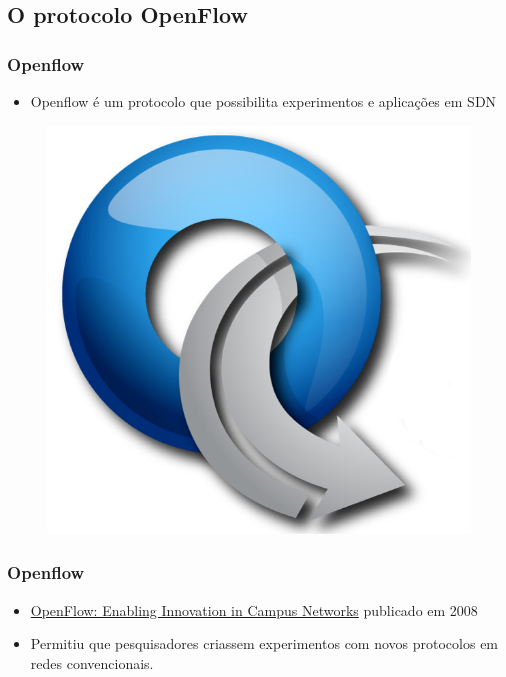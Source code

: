 
\subsection{O protocolo OpenFlow}


%
%
\begin{frame}\frametitle{Openflow}

    \begin{itemize}
    \item Openflow é um protocolo que possibilita experimentos e aplicações
          em SDN
    \end{itemize}
    \begin{figure}[h]
        \centering
        \includegraphics[scale=0.2]{images/openflow}
    \end{figure}
\end{frame}


%
%
\begin{frame}\frametitle{Openflow}

    \begin{itemize}
        \setlength{\itemsep}{.5cm}
    \item \href{http://archive.openflow.org/documents/openflow-wp-latest.pdf}
        {OpenFlow: Enabling Innovation in Campus Networks} publicado em 2008 
    \item Permitiu que pesquisadores criassem experimentos com novos
          protocolos em redes convencionais.
    \end{itemize}

\end{frame}




